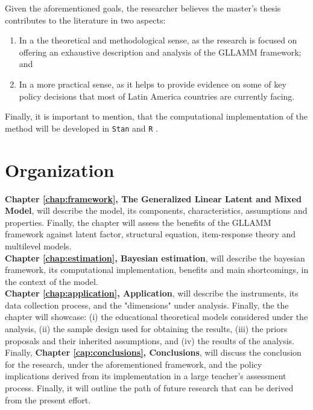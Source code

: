 \noindent Given the aforementioned goals, the researcher believes the master's thesis contributes to the literature in two aspects: 

\begin{enumerate}
	\item In a the theoretical and methodological sense, as the research is focused on offering an exhaustive description and analysis of the GLLAMM framework; and 
	
	\item In a more practical sense, as it helps to provide evidence on some of key policy decisions that most of Latin America countries are currently facing.
\end{enumerate}

\noindent Finally, it is important to mention, that the computational implementation of the method will be developed in \texttt{Stan} \cite{Stan2020} and \texttt{R} \cite{R2015, RStan2020}.



\section{Organization}

\textbf{Chapter \ref{chap:framework}, The Generalized Linear Latent and Mixed Model}, will describe the model, its components, characteristics, assumptions and properties. Finally, the chapter will assess the benefits of the GLLAMM framework against latent factor, structural equation, item-response theory and multilevel models. \\

\noindent \textbf{Chapter \ref{chap:estimation}, Bayesian estimation}, will describe the bayesian framework, its computational implementation, benefits and main shortcomings, in the context of the model. \\

\noindent \textbf{Chapter \ref{chap:application}, Application}, will describe the instruments, its data collection process, and the "dimensions" under analysis. Finally, the the chapter will showcase: (i) the educational theoretical models considered under the analysis, (ii) the sample design used for obtaining the results, (iii) the priors proposals and their inherited assumptions, and (iv) the results of the analysis. \\

\noindent Finally, \textbf{Chapter \ref{cap:conclusions}, Conclusions}, will discuss the conclusion for the research, under the aforementioned framework, and the policy implications derived from its implementation in a large teacher's assessment process. Finally, it will outline the path of future research that can be derived from the present effort.
